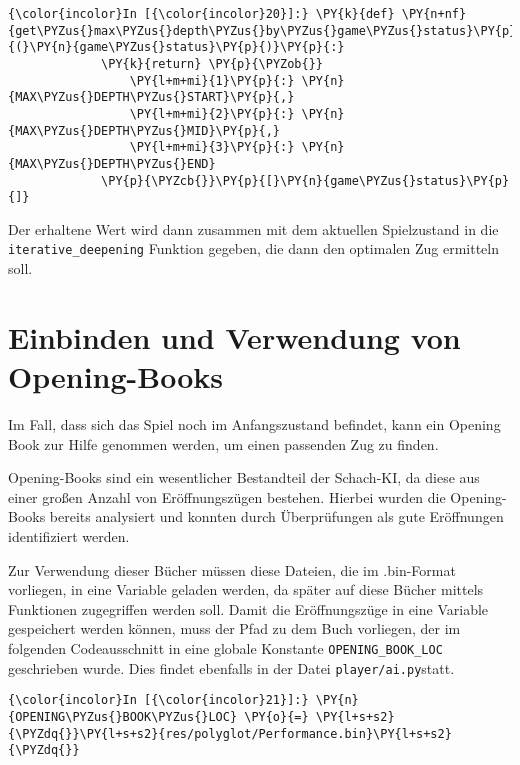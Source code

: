     \begin{Verbatim}[commandchars=\\\{\}]
{\color{incolor}In [{\color{incolor}20}]:} \PY{k}{def} \PY{n+nf}{get\PYZus{}max\PYZus{}depth\PYZus{}by\PYZus{}game\PYZus{}status}\PY{p}{(}\PY{n}{game\PYZus{}status}\PY{p}{)}\PY{p}{:}
             \PY{k}{return} \PY{p}{\PYZob{}}
                 \PY{l+m+mi}{1}\PY{p}{:} \PY{n}{MAX\PYZus{}DEPTH\PYZus{}START}\PY{p}{,} 
                 \PY{l+m+mi}{2}\PY{p}{:} \PY{n}{MAX\PYZus{}DEPTH\PYZus{}MID}\PY{p}{,}
                 \PY{l+m+mi}{3}\PY{p}{:} \PY{n}{MAX\PYZus{}DEPTH\PYZus{}END}
             \PY{p}{\PYZcb{}}\PY{p}{[}\PY{n}{game\PYZus{}status}\PY{p}{]}
\end{Verbatim}

    Der erhaltene Wert wird dann zusammen mit dem aktuellen Spielzustand in
die \texttt{iterative\_deepening} Funktion gegeben, die dann den
optimalen Zug ermitteln soll.

    \section{Einbinden und Verwendung von
Opening-Books}\label{einbinden-und-verwendung-von-opening-books}

Im Fall, dass sich das Spiel noch im Anfangszustand befindet, kann ein
Opening Book zur Hilfe genommen werden, um einen passenden Zug zu
finden.

Opening-Books sind ein wesentlicher Bestandteil der Schach-KI, da diese
aus einer großen Anzahl von Eröffnungszügen bestehen. Hierbei wurden die
Opening-Books bereits analysiert und konnten durch Überprüfungen als
gute Eröffnungen identifiziert werden.

Zur Verwendung dieser Bücher müssen diese Dateien, die im .bin-Format
vorliegen, in eine Variable geladen werden, da später auf diese Bücher
mittels Funktionen zugegriffen werden soll. Damit die Eröffnungszüge in
eine Variable gespeichert werden können, muss der Pfad zu dem Buch
vorliegen, der im folgenden Codeausschnitt in eine globale Konstante
\texttt{OPENING\_BOOK\_LOC} geschrieben wurde. Dies findet ebenfalls in
der Datei \texttt{player/ai.py}statt.

    \begin{Verbatim}[commandchars=\\\{\}]
{\color{incolor}In [{\color{incolor}21}]:} \PY{n}{OPENING\PYZus{}BOOK\PYZus{}LOC} \PY{o}{=} \PY{l+s+s2}{\PYZdq{}}\PY{l+s+s2}{res/polyglot/Performance.bin}\PY{l+s+s2}{\PYZdq{}}
\end{Verbatim}

